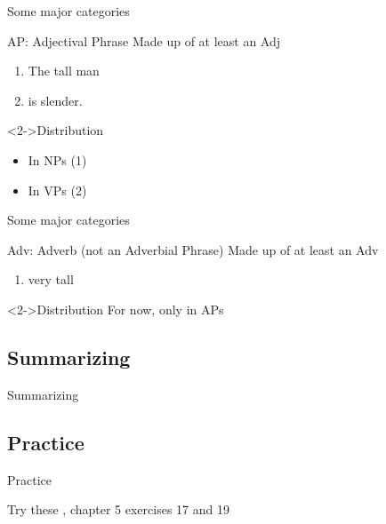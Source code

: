\documentclass{beamer}
\newcommand{\subonetwo}{Some major categories}
\newcommand{\subonethree}{Summarizing}
\newcommand{\subonefour}{Practice}
\begin{document}
      \begin{frame}{\subonetwo}
        \begin{block}{AP: Adjectival Phrase}
          Made up of at least an Adj
        \end{block}
        \begin{example}
          \begin{enumerate}
            \item \only<2->{[NP }The \only<2->{[AP }tall\only<2->{]} man\only<2->{]}
            \item \only<3->{[VP }is \only<3->{[AP }slender\only<3->{]}.\only<3->{]}
          \end{enumerate}
        \end{example}
        \begin{block}<2->{Distribution}
          \begin{itemize}
            \item<2-> In NPs (1)
            \item<3-> In VPs (2)
          \end{itemize}
        \end{block}
      \end{frame}

      \begin{frame}{\subonetwo}
        \begin{block}{Adv: Adverb (not an Adverbial Phrase)}
          Made up of at least an Adv
        \end{block}
        \begin{example}
          \begin{enumerate}
            \item \only<2->{[AP [Adv }very\only<2->{]} tall\only<2->{]}
          \end{enumerate}
        \end{example}
        \begin{block}<2->{Distribution}
          For now, only in APs
        \end{block}
      \end{frame}

    \subsection{\subonethree}
      \begin{frame}{\subonethree}
        \small
          
      \end{frame}

    \subsection{\subonefour}
      \begin{frame}{\subonefour}
        \begin{block}{Try these}
          \textcite{dawson_language_2016}, chapter 5 exercises 17 and 19
        \end{block}
      \end{frame}
\end{document}
